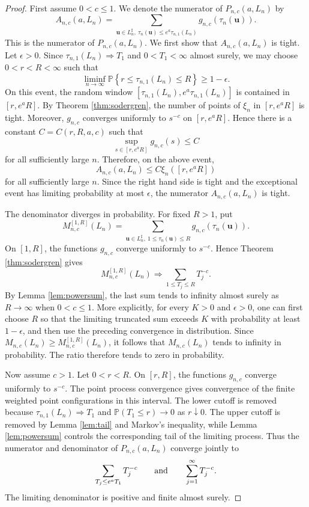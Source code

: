 \documentclass[a4paper,12pt]{article}
\theoremstyle{definition}
\theoremstyle{remark}
\newcommand{\pr}{\mathbb P}
\begin{document}
\begin{proof}
First assume $0<c\le1$.
We denote the numerator of $P_{n,c}(a,L_n)$ by
$$
A_{n,c}(a,L_n)=
\sum_{\bm u\in L_n^\sharp,\ \tau_n(\bm u)\le e^a\tau_{n,1}(L_n)}
g_{n,c}(\tau_n(\bm u)).
$$
This is the numerator of $P_{n,c}(a,L_n)$.
We first show that $A_{n,c}(a,L_n)$ is tight.
Let $\epsilon>0$.
Since $\tau_{n,1}(L_n)\Rightarrow T_1$ and $0<T_1<\infty$ almost surely, we may choose
$0<r<R<\infty$ such that
$$
\liminf_{n\to\infty}
\pr\left\{r\le \tau_{n,1}(L_n)\le R\right\}\ge 1-\epsilon.
$$
On this event, the random window
$[\tau_{n,1}(L_n),e^a\tau_{n,1}(L_n)]$ is contained in $[r,e^aR]$.
By Theorem \ref{thm:sodergren}, the number of points of $\xi_n$ in
$[r,e^aR]$ is tight.
Moreover, $g_{n,c}$ converges uniformly to $s^{-c}$ on $[r,e^aR]$.
Hence there is a constant $C=C(r,R,a,c)$ such that
$$
\sup_{s\in[r,e^aR]}g_{n,c}(s)\le C
$$
for all sufficiently large $n$.
Therefore, on the above event,
$$
A_{n,c}(a,L_n)
\le
C\xi_n([r,e^aR])
$$
for all sufficiently large $n$.
Since the right hand side is tight and the exceptional event has limiting
probability at most $\epsilon$, the numerator $A_{n,c}(a,L_n)$ is tight.

The denominator diverges in probability.
For fixed $R>1$, put
$$
M_{n,c}^{[1,R]}(L_n)=
\sum_{\bm u\in L_n^\sharp,\ 1\le\tau_n(\bm u)\le R}
 g_{n,c}(\tau_n(\bm u)).
$$
On $[1,R]$, the functions $g_{n,c}$ converge uniformly to $s^{-c}$.
Hence Theorem \ref{thm:sodergren} gives
$$
M_{n,c}^{[1,R]}(L_n)
\Rightarrow
\sum_{1\le T_j\le R}T_j^{-c}.
$$
By Lemma \ref{lem:powersum}, the last sum tends to infinity almost surely as $R\to\infty$ when $0<c\le1$.
More explicitly, for every $K>0$ and $\epsilon>0$, one can first choose $R$ so that the limiting truncated sum exceeds $K$ with probability at least $1-\epsilon$, and then use the preceding convergence in distribution.
Since $M_{n,c}(L_n)\ge M_{n,c}^{[1,R]}(L_n)$, it follows that $M_{n,c}(L_n)$ tends to infinity in probability.
The ratio therefore tends to zero in probability.

Now assume $c>1$.
Let $0<r<R$.
On $[r,R]$, the functions $g_{n,c}$ converge uniformly to $s^{-c}$.
The point process convergence gives convergence of the finite weighted point configurations in this interval.
The lower cutoff is removed because $\tau_{n,1}(L_n)\Rightarrow T_1$ and $\pr(T_1\le r)\to0$ as $r\downarrow0$.
The upper cutoff is removed by Lemma \ref{lem:tail} and Markov's inequality, while Lemma \ref{lem:powersum} controls the corresponding tail of the limiting process.
Thus the numerator and denominator of $P_{n,c}(a,L_n)$ converge jointly to
$$
\sum_{T_j\le e^aT_1}T_j^{-c}
\qquad {\rm and}\qquad
\sum_{j=1}^{\infty}T_j^{-c}.
$$
The limiting denominator is positive and finite almost surely.


\end{proof}
\end{document}
